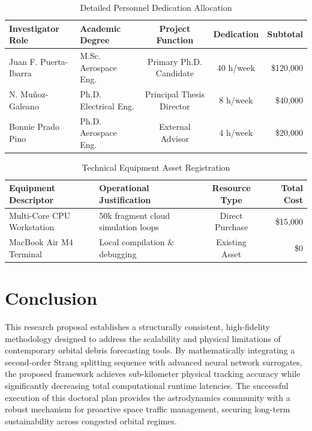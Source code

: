 \documentclass[11pt,letterpaper]{article}
\begin{document}
\begin{table}[h!]
\caption{\label{tab:personnel} Detailed Personnel Dedication Allocation}
\centering
\begin{tabular}{llccr}
\hline
\textbf{Investigator Role} & \textbf{Academic Degree} & \textbf{Project Function} & \textbf{Dedication} & \textbf{Subtotal} \\ \hline
Juan F. Puerta-Ibarra     & M.Sc. Aerospace Eng.     & Primary Ph.D. Candidate   & 40 h/week           & \$120,000         \\
N. Muñoz-Galeano          & Ph.D. Electrical Eng.    & Principal Thesis Director & 8 h/week            & \$40,000          \\
Bonnie Prado Pino         & Ph.D. Aerospace Eng.     & External Advisor          & 4 h/week            & \$20,000          \\ \hline
\end{tabular}
\end{table}

\begin{table}[h!]
\caption{\label{tab:equipment} Technical Equipment Asset Registration}
\centering
\begin{tabular}{llcr}
\hline
\textbf{Equipment Descriptor} & \textbf{Operational Justification} & \textbf{Resource Type} & \textbf{Total Cost} \\ \hline
Multi-Core CPU Workstation    & 50k fragment cloud simulation loops & Direct Purchase        & \$15,000            \\
MacBook Air M4 Terminal       & Local compilation \& debugging      & Existing Asset         & \$0                 \\ \hline
\end{tabular}
\end{table}


\section{Conclusion}
This research proposal establishes a structurally consistent, high-fidelity methodology designed to address the scalability and physical limitations of contemporary orbital debris forecasting tools. By mathematically integrating a second-order Strang splitting sequence with advanced neural network surrogates, the proposed framework achieves sub-kilometer physical tracking accuracy while significantly decreasing total computational runtime latencies. The successful execution of this doctoral plan provides the astrodynamics community with a robust mechanism for proactive space traffic management, securing long-term sustainability across congested orbital regimes.
\end{document}
